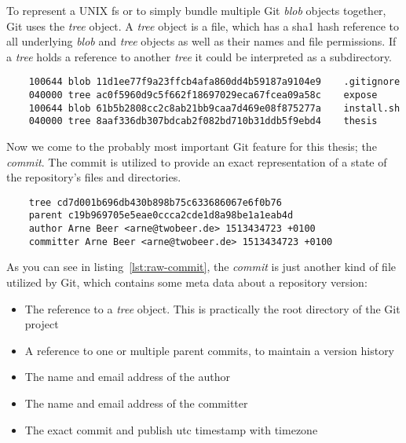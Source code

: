 To represent a UNIX \ac{fs} or to simply bundle multiple Git \emph{blob} objects together, Git uses the \emph{tree} object.
A \emph{tree} object is a file, which has a \ac{sha1} hash reference to all underlying \emph{blob} and \emph{tree} objects as well as their names and file permissions.
If a \emph{tree} holds a reference to another \emph{tree} it could be interpreted as a subdirectory.

\begin{verbatim}
    100644 blob 11d1ee77f9a23ffcb4afa860dd4b59187a9104e9	.gitignore
    040000 tree ac0f5960d9c5f662f18697029eca67fcea09a58c	expose
    100644 blob 61b5b2808cc2c8ab21bb9caa7d469e08f875277a	install.sh
    040000 tree 8aaf336db307bdcab2f082bd710b31ddb5f9ebd4	thesis
\end{verbatim}
\begingroup
{}
\endgroup

Now we come to the probably most important Git feature for this thesis; the \emph{commit}.
The commit is utilized to provide an exact representation of a state of the repository's files and directories.

\begin{verbatim}
    tree cd7d001b696db430b898b75c633686067e6f0b76
    parent c19b969705e5eae0ccca2cde1d8a98be1a1eab4d
    author Arne Beer <arne@twobeer.de> 1513434723 +0100
    committer Arne Beer <arne@twobeer.de> 1513434723 +0100
\end{verbatim}
\begingroup
{}
\endgroup

As you can see in listing~\ref{lst:raw-commit}, the \emph{commit} is just another kind of file utilized by Git, which contains some meta data about a repository version:

\begin{itemize}
    \item The reference to a \emph{tree} object. This is practically the root directory of the Git project
    \item A reference to one or multiple parent commits, to maintain a version history
    \item The name and email address of the author
    \item The name and email address of the committer
    \item The exact commit and publish \ac{utc} timestamp with timezone
\end{itemize}


